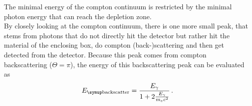 The minimal energy of the compton continuum is restricted by the minimal photon energy that can reach the depletion zone. \\
By closely looking at the compton continuum, there is one more small peak, that stems from photons that do not directly hit the detector but rather hit the material of the enclosing box, do compton (back-)scattering and then get detected from the detector.
Because this peak comes from compton backscattering ($\Theta = \pi$), the energy of this backscattering peak can be evaluated as 
\begin{align}
    E_\T{backscatter} = \frac{E_\gamma}{1 + 2 \frac{E_\gamma}{m_e c^2}} \, .
\end{align}






\clearpage